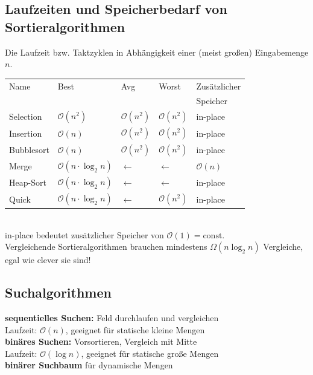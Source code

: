 \documentclass[fs, footer]{latex4ei}
\begin{document}
\begin{multicols*}{4}
{{\subsection{Laufzeiten und Speicherbedarf von Sortieralgorithmen}
Die Laufzeit bzw. Taktzyklen in Abhängigkeit einer (meist großen) Eingabemenge $n$.\\
\begin{tabular}{l|l|l|l|l}
	Name & Best & Avg & Worst & Zusätzlicher\\
	 & & & & Speicher\\ \hline
	Selection & $\mathcal O (n^2)$ & $\mathcal O (n^2)$ & $\mathcal O (n^2)$ & in-place\\
	Insertion & $\mathcal O (n)$ & $\mathcal O (n^2)$ & $\mathcal O (n^2)$ & in-place\\
	Bubblesort & $\mathcal O (n)$ & $\mathcal O (n^2)$ & $\mathcal O (n^2)$ & in-place\\
	Merge & $\mathcal O (n \cdot \log_2 n)$ & $\leftarrow$ & $\leftarrow$ & $\mathcal O (n)$\\ %
	Heap-Sort & $\mathcal O (n \cdot \log_2 n)$ & $\leftarrow$ & $\leftarrow$ & in-place\\	
	Quick & $\mathcal O (n \cdot \log_2 n)$ & $\leftarrow$ & $\mathcal O (n^2)$ & in-place\\
\end{tabular}\\
in-place bedeutet zusätzlicher Speicher von $\mathcal O (1) = \text{const.}$\\
Vergleichende Sortieralgorithmen brauchen mindestens $\Omega(n \log_2 n)$ Vergleiche, egal wie clever sie sind!





\subsection{Suchalgorithmen}
\textbf{sequentielles Suchen:} Feld durchlaufen und vergleichen\\
Laufzeit: $\mathcal O(n)$, geeignet für statische kleine Mengen\\
\textbf{binäres Suchen:} Vorsortieren, Vergleich mit Mitte\\
Laufzeit: $\mathcal O(\log n)$, geeignet für statische große Mengen\\
\textbf{binärer Suchbaum} für dynamische Mengen\\

}}
\end{multicols*}
\end{document}
